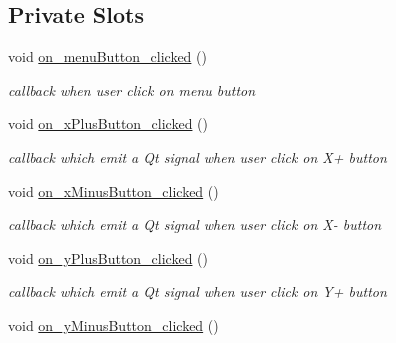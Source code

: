 \subsection*{Private Slots}
\begin{DoxyCompactItemize}
\item 
\hypertarget{class_main_window_aea3e97d7cd92a03e10cba58c85156b4c}{void \hyperlink{class_main_window_aea3e97d7cd92a03e10cba58c85156b4c}{on\-\_\-menu\-Button\-\_\-clicked} ()}\label{class_main_window_aea3e97d7cd92a03e10cba58c85156b4c}

\begin{DoxyCompactList}\small\item\em callback when user click on menu button \end{DoxyCompactList}\item 
\hypertarget{class_main_window_af06ad081f0229a31ae29a0e328e72d3b}{void \hyperlink{class_main_window_af06ad081f0229a31ae29a0e328e72d3b}{on\-\_\-x\-Plus\-Button\-\_\-clicked} ()}\label{class_main_window_af06ad081f0229a31ae29a0e328e72d3b}

\begin{DoxyCompactList}\small\item\em callback which emit a Qt signal when user click on X+ button \end{DoxyCompactList}\item 
\hypertarget{class_main_window_add37926ce0c9d9aa48a1c8e482b097e4}{void \hyperlink{class_main_window_add37926ce0c9d9aa48a1c8e482b097e4}{on\-\_\-x\-Minus\-Button\-\_\-clicked} ()}\label{class_main_window_add37926ce0c9d9aa48a1c8e482b097e4}

\begin{DoxyCompactList}\small\item\em callback which emit a Qt signal when user click on X-\/ button \end{DoxyCompactList}\item 
\hypertarget{class_main_window_a9d41c294dace3074c72ec6f8bd452fd0}{void \hyperlink{class_main_window_a9d41c294dace3074c72ec6f8bd452fd0}{on\-\_\-y\-Plus\-Button\-\_\-clicked} ()}\label{class_main_window_a9d41c294dace3074c72ec6f8bd452fd0}

\begin{DoxyCompactList}\small\item\em callback which emit a Qt signal when user click on Y+ button \end{DoxyCompactList}\item 
\hypertarget{class_main_window_ae4af2cd51d482b1009bb688ce49fe0bd}{void \hyperlink{class_main_window_ae4af2cd51d482b1009bb688ce49fe0bd}{on\-\_\-y\-Minus\-Button\-\_\-clicked} ()}\label{class_main_window_ae4af2cd51d482b1009bb688ce49fe0bd}


\end{DoxyCompactItemize}
